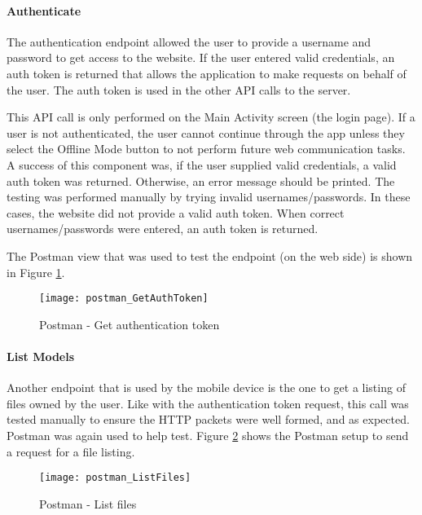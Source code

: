             \paragraph{Authenticate}

                The authentication endpoint allowed the user to provide a username and password to get access to the website.  If the user entered valid credentials, an auth token is returned that allows the application to make requests on behalf of the user.  The auth token is used in the other API calls to the server.

                This API call is only performed on the Main Activity screen (the login page).  If a user is not authenticated, the user cannot continue through the app unless they select the Offline Mode button to not perform future web communication tasks.  A success of this component was, if the user supplied valid credentials, a valid auth token was returned.  Otherwise, an error message should be printed.  The testing was performed manually by trying invalid usernames/passwords.  In these cases, the website did not provide a valid auth token.  When correct usernames/passwords were entered, an auth token is returned.

                The Postman view that was used to test the endpoint (on the web side) is shown in Figure \ref{fig:mobilePostmanGetAuthToken}.

                \begin{figure}[H]
                    \texttt{[image: postman\_GetAuthToken]}
                    \centering
                    \caption{Postman - Get authentication token}
                    \label{fig:mobilePostmanGetAuthToken}
                \end{figure}
                
            \paragraph{List Models}

                Another endpoint that is used by the mobile device is the one to get a listing of files owned by the user.  Like with the authentication token request, this call was tested manually to ensure the HTTP packets were well formed, and as expected.  Postman was again used to help test.  Figure \ref{fig:mobilePostmanListFiles} shows the Postman setup to send a request for a file listing.  
                
                \begin{figure}[H]
                    \texttt{[image: postman\_ListFiles]}
                    \centering
                    \caption{Postman - List files}
                    \label{fig:mobilePostmanListFiles}
                \end{figure}
                
